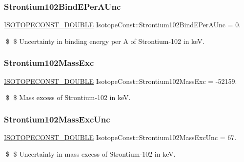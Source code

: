 \subsubsection{\texorpdfstring{Strontium102\+Bind\+E\+Per\+A\+Unc}{Strontium102BindEPerAUnc}}
{\footnotesize\ttfamily \mbox{\hyperlink{group___isotope_const-_macros_ga8f45a7272ce02c0b4c65c44636ed719a}{I\+S\+O\+T\+O\+P\+E\+C\+O\+N\+S\+T\+\_\+\+D\+O\+U\+B\+LE}} Isotope\+Const\+::\+Strontium102\+Bind\+E\+Per\+A\+Unc = 0.}

\$ \$ Uncertainty in binding energy per A of Strontium-\/102 in keV. \mbox{\label{group___isotope_const-_strontium-_sr102_ga228b891a747b2c142fee695c3b9182d1}} 
\subsubsection{\texorpdfstring{Strontium102\+Mass\+Exc}{Strontium102MassExc}}
{\footnotesize\ttfamily \mbox{\hyperlink{group___isotope_const-_macros_ga8f45a7272ce02c0b4c65c44636ed719a}{I\+S\+O\+T\+O\+P\+E\+C\+O\+N\+S\+T\+\_\+\+D\+O\+U\+B\+LE}} Isotope\+Const\+::\+Strontium102\+Mass\+Exc = -\/52159.}

\$ \$ Mass excess of Strontium-\/102 in keV. \mbox{\label{group___isotope_const-_strontium-_sr102_gac733369df8d9434552e68a21f2e250e5}} 
\subsubsection{\texorpdfstring{Strontium102\+Mass\+Exc\+Unc}{Strontium102MassExcUnc}}
{\footnotesize\ttfamily \mbox{\hyperlink{group___isotope_const-_macros_ga8f45a7272ce02c0b4c65c44636ed719a}{I\+S\+O\+T\+O\+P\+E\+C\+O\+N\+S\+T\+\_\+\+D\+O\+U\+B\+LE}} Isotope\+Const\+::\+Strontium102\+Mass\+Exc\+Unc = 67.}

\$ \$ Uncertainty in mass excess of Strontium-\/102 in keV. \mbox{\label{group___isotope_const-_strontium-_sr102_ga99f0ffce71dab7524da757080f51ac7c}} 
